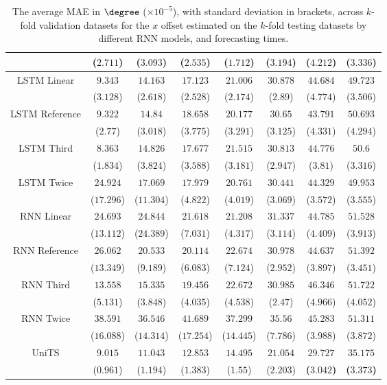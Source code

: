 \begin{table}[!ht]
{\begin{tabular}{|c|c|c|c|c|c|c|c|}
			 & ($2.711$) & ($3.093$) & ($2.535$) & ($1.712$) & ($3.194$) & ($4.212$) & ($3.336$) \\ \hline
			\multirow{2}{*}{LSTM Linear} & $9.343$ & $14.163$ & $17.123$ & $21.006$ & $30.878$ & $44.684$ & $49.723$ \\
			 & ($3.128$) & ($2.618$) & ($2.528$) & ($2.174$) & ($2.89$) & ($4.774$) & ($3.506$) \\ \hline
			\multirow{2}{*}{LSTM Reference} & $9.322$ & $14.84$ & $18.658$ & $20.177$ & $30.65$ & $43.791$ & $50.693$ \\
			 & ($2.77$) & ($3.018$) & ($3.775$) & ($3.291$) & ($3.125$) & ($4.331$) & ($4.294$) \\ \hline
			\multirow{2}{*}{LSTM Third} & $8.363$ & $14.826$ & $17.677$ & $21.515$ & $30.813$ & $44.776$ & $50.6$ \\
			 & ($1.834$) & ($3.824$) & ($3.588$) & ($3.181$) & ($2.947$) & ($3.81$) & ($3.316$) \\ \hline
			\multirow{2}{*}{LSTM Twice} & $24.924$ & $17.069$ & $17.979$ & $20.761$ & $30.441$ & $44.329$ & $49.953$ \\
			 & ($17.296$) & ($11.304$) & ($4.822$) & ($4.019$) & ($3.069$) & ($3.572$) & ($3.555$) \\ \hline
			\multirow{2}{*}{RNN Linear} & $24.693$ & $24.844$ & $21.618$ & $21.208$ & $31.337$ & $44.785$ & $51.528$ \\
			 & ($13.112$) & ($24.389$) & ($7.031$) & ($4.317$) & ($3.114$) & ($4.409$) & ($3.913$) \\ \hline
			\multirow{2}{*}{RNN Reference} & $26.062$ & $20.533$ & $20.114$ & $22.674$ & $30.978$ & $44.637$ & $51.392$ \\
			 & ($13.349$) & ($9.189$) & ($6.083$) & ($7.124$) & ($2.952$) & ($3.897$) & ($3.451$) \\ \hline
			\multirow{2}{*}{RNN Third} & $13.558$ & $15.335$ & $19.456$ & $22.672$ & $30.985$ & $46.346$ & $51.722$ \\
			 & ($5.131$) & ($3.848$) & ($4.035$) & ($4.538$) & ($2.47$) & ($4.966$) & ($4.052$) \\ \hline
			\multirow{2}{*}{RNN Twice} & $38.591$ & $36.546$ & $41.689$ & $37.299$ & $35.56$ & $45.283$ & $51.311$ \\
			 & ($16.088$) & ($14.314$) & ($17.254$) & ($14.445$) & ($7.786$) & ($3.988$) & ($3.872$) \\ \hline
			\multirow{2}{*}{UniTS} & $9.015$ & $11.043$ & $12.853$ & $14.495$ & $21.054$ & $\mathbf{29.727}$ & $\mathbf{35.175}$ \\
			 & ($0.961$) & ($1.194$) & ($1.383$) & ($1.55$) & ($2.203$) & \textbf{(}$\mathbf{3.042}$\textbf{)} & \textbf{(}$\mathbf{3.373}$\textbf{)} \\ \hline
		\end{tabular}
	}
	\caption{The average MAE in $\degree$ ($\times 10^{-5}$), with standard deviation in brackets, across $k$-fold validation datasets for the $x$ offset estimated on the $k$-fold testing datasets by different RNN models, and forecasting times.}
	\label{tab:all_longitude_no_abs_MAE}
\end{table}

